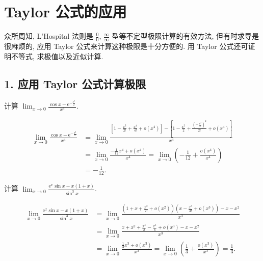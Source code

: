 \section{Taylor 公式的应用}\label{sec:4.2}

众所周知, L'Hospital 法则是 $\frac{0}{0}$, $\frac{\infty}{\infty}$ 型等不定型极限计算的有效方法, 但有时求导是很麻烦的, 应用 Taylor 公式来计算这种极限是十分方便的. 用 Taylor 公式还可证明不等式, 求极值以及近似计算.

\subsection*{1. 应用 Taylor 公式计算极限}

\begin{example}\label{ex:4.2.1}
计算 $\lim_{x\to 0}\frac{\cos x-\mathrm{e}^{-\frac{x^2}{2}}}{x^4}$.
\end{example}

\begin{solution}
\begin{align*}
\lim_{x\to 0}\frac{\cos x-\mathrm{e}^{-\frac{x^2}{2}}}{x^4}
&= \lim_{x\to 0}\frac{\left[1-\frac{x^2}{2!}+\frac{x^4}{4!}+o(x^4)\right]-\left[1-\frac{x^2}{2}+\frac{\left(-\frac{x^2}{2}\right)^2}{2!}+o(x^4)\right]}{x^4} \\
&= \lim_{x\to 0}\frac{-\frac{1}{12}x^4+o(x^4)}{x^4} = \lim_{x\to 0}\left(-\frac{1}{12}+\frac{o(x^4)}{x^4}\right) \\
&= -\frac{1}{12}.
\end{align*}
\end{solution}

\begin{example}\label{ex:4.2.2}
计算 $\lim_{x\to 0}\frac{\mathrm{e}^{x}\sin x-x(1+x)}{\sin^{3}x}$.
\end{example}

\begin{solution}
\begin{align*}
\lim_{x\to 0}\frac{\mathrm{e}^{x}\sin x-x(1+x)}{\sin^{3}x}
&= \lim_{x\to 0}\frac{\left(1+x+\frac{x^{2}}{2!}+o(x^{2})\right)\left(x-\frac{x^{3}}{3!}+o(x^{3})\right)-x-x^{2}}{x^{3}} \\
&= \lim_{x\to 0}\frac{x+x^{2}+\frac{x^{3}}{2}-\frac{x^{3}}{6}+o(x^{3})-x-x^{2}}{x^{3}} \\
&= \lim_{x\to 0}\frac{\frac{1}{3}x^{3}+o(x^{3})}{x^{3}} = \lim_{x\to 0}\left(\frac{1}{3}+\frac{o(x^{3})}{x^{3}}\right) = \frac{1}{3}.
\end{align*}
\end{solution}

